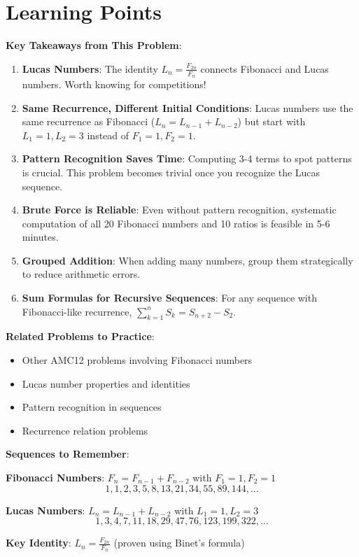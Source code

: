 \documentclass[12pt]{article}
\begin{document}
\section*{Learning Points}

\textbf{Key Takeaways from This Problem}:

\begin{enumerate}
    \item \textbf{Lucas Numbers}: The identity $L_n = \frac{F_{2n}}{F_n}$ connects Fibonacci and Lucas numbers. Worth knowing for competitions!
    
    \item \textbf{Same Recurrence, Different Initial Conditions}: Lucas numbers use the same recurrence as Fibonacci ($L_n = L_{n-1} + L_{n-2}$) but start with $L_1 = 1, L_2 = 3$ instead of $F_1 = 1, F_2 = 1$.
    
    \item \textbf{Pattern Recognition Saves Time}: Computing 3-4 terms to spot patterns is crucial. This problem becomes trivial once you recognize the Lucas sequence.
    
    \item \textbf{Brute Force is Reliable}: Even without pattern recognition, systematic computation of all 20 Fibonacci numbers and 10 ratios is feasible in 5-6 minutes.
    
    \item \textbf{Grouped Addition}: When adding many numbers, group them strategically to reduce arithmetic errors.
    
    \item \textbf{Sum Formulas for Recursive Sequences}: For any sequence with Fibonacci-like recurrence, $\sum_{k=1}^{n} S_k = S_{n+2} - S_2$.
\end{enumerate}

\vspace{0.5cm}

\textbf{Related Problems to Practice}:
\begin{itemize}
    \item Other AMC12 problems involving Fibonacci numbers
    \item Lucas number properties and identities
    \item Pattern recognition in sequences
    \item Recurrence relation problems
\end{itemize}

\vspace{0.5cm}

\textbf{Sequences to Remember}:

\textbf{Fibonacci Numbers}: $F_n = F_{n-1} + F_{n-2}$ with $F_1 = 1, F_2 = 1$
$$1, 1, 2, 3, 5, 8, 13, 21, 34, 55, 89, 144, \ldots$$

\textbf{Lucas Numbers}: $L_n = L_{n-1} + L_{n-2}$ with $L_1 = 1, L_2 = 3$
$$1, 3, 4, 7, 11, 18, 29, 47, 76, 123, 199, 322, \ldots$$

\textbf{Key Identity}: $L_n = \frac{F_{2n}}{F_n}$ (proven using Binet's formula)
\end{document}
